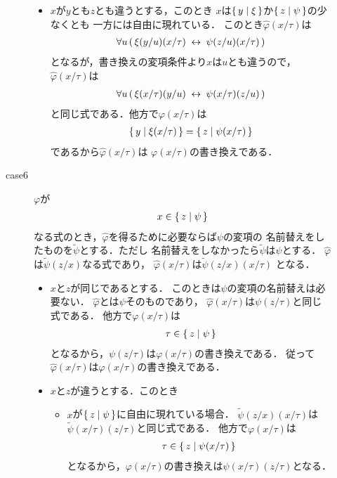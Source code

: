 \begin{metaprf}[第一]
\begin{description}
\begin{description}
\begin{itemize}
							\item $x$が$y$とも$z$とも違うとする，このとき
								$x$は$\{\, y \mid \xi\, \}$か$\{\, z \mid \psi\, \}$の少なくとも
								一方には自由に現れている．
								このとき$\widehat{\varphi}(x/\tau)$は
								\begin{align}
									\forall u\, (\, \xi(y/u)(x/\tau) \hspace{0.25em}\leftrightarrow\hspace{0.25em} \psi(z/u)(x/\tau)\, )
								\end{align}
								となるが，書き換えの変項条件より$x$は$u$とも違うので，
								$\widehat{\varphi}(x/\tau)$は
								\begin{align}
									\forall u\, (\, \xi(x/\tau)(y/u) \hspace{0.25em}\leftrightarrow\hspace{0.25em} \psi(x/\tau)(z/u)\, )
								\end{align}
								と同じ式である．他方で$\varphi(x/\tau)$は
								\begin{align}
									\{\, y \mid \xi(x/\tau)\, \} = \{\, z \mid \psi(x/\tau)\, \}
								\end{align}
								であるから$\widehat{\varphi}(x/\tau)$は
								$\varphi(x/\tau)$の書き換えである．
						\end{itemize}
						
					\item[case6] $\varphi$が
						\begin{align}
							x \in \{\, z \mid \psi\, \}
						\end{align}
						なる式のとき，$\widehat{\varphi}$を得るために必要ならば$\psi$の変項の
						名前替えをしたものを$\widetilde{\psi}$とする．ただし
						名前替えをしなかったら$\widetilde{\psi}$は$\psi$とする．
						$\widehat{\varphi}$は$\widetilde{\psi}(z/x)$なる式であり，
						$\widehat{\varphi}(x/\tau)$は$\widetilde{\psi}(z/x)(x/\tau)$
						となる．
						\begin{itemize}
							\item $x$と$z$が同じであるとする．
								このときは$\psi$の変項の名前替えは必要ない．
								$\widehat{\varphi}$とは$\psi$そのものであり，
								$\widehat{\varphi}(x/\tau)$は$\psi(z/\tau)$と同じ式である．
								他方で$\varphi(x/\tau)$は
								\begin{align}
									\tau \in \{\, z \mid \psi\, \}
								\end{align}
								となるから，$\psi(z/\tau)$は$\varphi(x/\tau)$の書き換えである．
								従って$\widehat{\varphi}(x/\tau)$は$\varphi(x/\tau)$の書き換えである．
								
							\item $x$と$z$が違うとする．このとき
								\begin{itemize}
									\item $x$が$\{\, z \mid \psi\, \}$に自由に現れている場合．
										$\widetilde{\psi}(z/x)(x/\tau)$は
										$\widetilde{\psi}(x/\tau)(z/\tau)$と同じ式である．
										他方で$\varphi(x/\tau)$は
										\begin{align}
											\tau \in \{\, z \mid \psi(x/\tau)\, \}
										\end{align}
										となるから，$\varphi(x/\tau)$の書き換えは$\psi(x/\tau)(z/\tau)$となる．
										

\end{itemize}
\end{itemize}
\end{description}
\end{description}
\end{metaprf}
